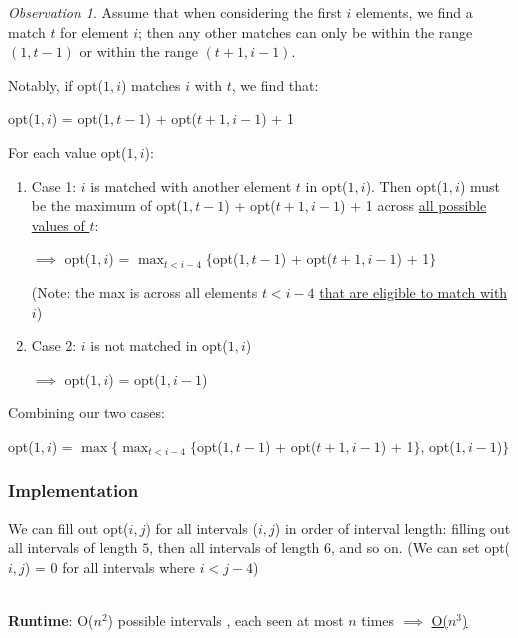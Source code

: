 \documentclass[12pt]{extarticle}
\theoremstyle{definition}
\theoremstyle{remark}
\newtheorem*{observation}{Observation}
\begin{document}
\begin{tcolorbox}[colback=white!95!black]
\begin{observation}
    Assume that when considering the first $i$ elements, we find a match $t$ for element $i$; then any other matches can only be within the range $(1,t-1)$ or within the range $(t+1,i-1)$.
    
    Notably, if opt($1,i$) matches $i$ with $t$, we find that: \begin{center}
        opt($1,i$) = opt($1,t-1$) + opt($t+1,i-1$) + 1
    \end{center}

    \noindent For each value opt($1,i$): \begin{enumerate}
        \item Case 1: $i$ is matched with another element $t$ in opt($1,i$). Then opt($1,i$) must be the maximum of opt($1,t-1$) + opt($t+1,i-1$) + 1 across \ul{all possible values of $t$}: \begin{center}
            $\implies$ opt($1,i$) = $\max_{t<i-4}\{$opt($1,t-1$) + opt($t+1,i-1$) + 1$\}$

            (Note: the max is across all elements $t<i-4$ \ul{that are eligible to match with $i$})
        \end{center}
    
        \item Case 2: $i$ is not matched in opt($1,i$) \begin{center}
            $\implies$ opt($1,i$) = opt($1,i-1$)
        \end{center}
    \end{enumerate}

    \noindent Combining our two cases: \begin{center}
        opt($1,i$) = $\max\{\max_{t<i-4}\{$opt($1,t-1$) + opt($t+1,i-1$) + 1$\}$, opt($1,i-1$)$\}$
    \end{center}
\end{observation}
\end{tcolorbox}

\subsubsection*{Implementation}
We can fill out opt($i,j$) for all intervals ($i,j$) in order of interval length: filling out all intervals of length $5$, then all intervals of length $6$, and so on. (We can set opt($i,j$) = 0 for all intervals where $i<j-4$)

~\\
\noindent \textbf{Runtime}: O($n^2$) possible intervals , each seen at most $n$ times $\implies$ \ul{O($n^3$)}
\end{document}
